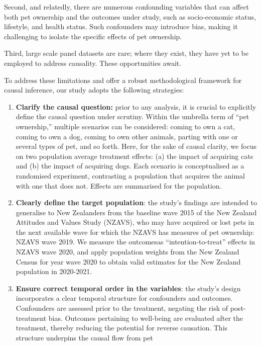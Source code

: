 \documentclass[
  singlecolumn,
  9pt]{article}
\begin{document}
Second, and relatedly, there are numerous confounding variables that can
affect both pet ownership and the outcomes under study, such as
socio-economic status, lifestyle, and health status. Such confounders
may introduce bias, making it challenging to isolate the specific
effects of pet ownership.

Third, large scale panel datasets are rare; where they exist, they have
yet to be employed to address causality. These opportunities await.

To address these limitations and offer a robust methodological framework
for causal inference, our study adopts the following strategies:

\begin{enumerate}
\def\labelenumi{\arabic{enumi}.}
\item
  \textbf{Clarify the causal question:} prior to any analysis, it is
  crucial to explicitly define the causal question under scrutiny.
  Within the umbrella term of ``pet ownership,'' multiple scenarios can
  be considered: coming to own a cat, coming to own a dog, coming to own
  other animals, parting with one or several types of pet, and so forth.
  Here, for the sake of causal clarity, we focus on two population
  average treatment effects: (a) the impact of acquiring cats and (b)
  the impact of acquiring dogs. Each scenario is conceptualised as a
  randomised experiment, contrasting a population that acquires the
  animal with one that does not. Effects are summarised for the
  population.
\item
  \textbf{Clearly define the target population}: the study's findings
  are intended to generalise to New Zealanders from the baseline wave
  2015 of the New Zealand Attitudes and Values Study (NZAVS), who may
  have acquired or lost pets in the next available wave for which the
  NZAVS has measures of pet ownership: NZAVS wave 2019. We measure the
  outcomesas ``intention-to-treat'' effects in NZAVS wave 2020, and
  apply population weights from the New Zealand Census for year wave
  2020 to obtain valid estimates for the New Zealand population in
  2020-2021.
\item
  \textbf{Ensure correct temporal order in the variables}: the study's
  design incorporates a clear temporal structure for confounders and
  outcomes. Confounders are assessed prior to the treatment, negating
  the risk of post-treatment bias. Outcomes pertaining to well-being are
  evaluated after the treatment, thereby reducing the potential for
  reverse causation. This structure underpins the causal flow from pet

\end{enumerate}
\end{document}
